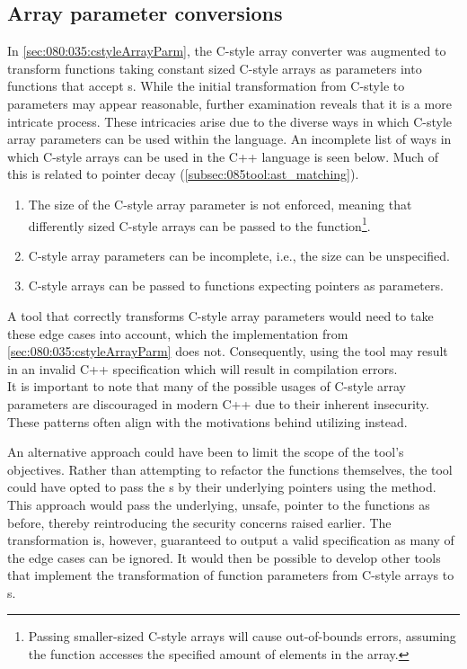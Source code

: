 \subsection{Array parameter conversions}\label{subsec:095disc:arrayParm}
In \cref{sec:080:035:cstyleArrayParm}, the C-style array converter was augmented to transform functions taking constant sized C-style arrays as parameters into functions that accept s.
While the initial transformation from C-style to  parameters may appear reasonable, further examination reveals that it is a more intricate process.
These intricacies arise due to the diverse ways in which C-style array parameters can be used within the language.
An incomplete list of ways in which C-style arrays can be used in the C++ language is seen below.
Much of this is related to pointer decay (\cref{subsec:085tool:ast_matching}).
\vspace*{-0.75em}
\begin{enumerate}
    \item The size of the C-style array parameter is not enforced, meaning that differently sized C-style arrays can be passed to the function\footnote{
        Passing smaller-sized C-style arrays will cause out-of-bounds errors, assuming the function accesses the specified amount of elements in the array.
    }.
    \item C-style array parameters can be incomplete, i.e., the size can be unspecified.
    \item C-style arrays can be passed to functions expecting pointers as parameters.
\end{enumerate}
\vspace*{-0.75em}
A tool that correctly transforms C-style array parameters would need to take these edge cases into account, which the implementation from \cref{sec:080:035:cstyleArrayParm} does not.
Consequently, using the tool may result in an invalid C++ specification which will result in compilation errors.\\
It is important to note that many of the possible usages of C-style array parameters are discouraged in modern C++ due to their inherent insecurity. 
These patterns often align with the motivations behind utilizing  instead.

An alternative approach could have been to limit the scope of the tool's objectives.
Rather than attempting to refactor the functions themselves, the tool could have opted to pass the s by their underlying pointers using the  method. This approach would pass the underlying, unsafe, pointer to the functions as before, thereby reintroducing the security concerns raised earlier.
The transformation is, however, guaranteed to output a valid specification as many of the edge cases can be ignored.
It would then be possible to develop other tools that implement the transformation of function parameters from C-style arrays to s.

